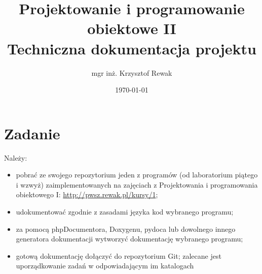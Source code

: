 \documentclass{article}
\title{
	Projektowanie i programowanie obiektowe II\\
	\Huge{Techniczna dokumentacja projektu}
}
\author{mgr inż. Krzysztof Rewak}
\date{\today}
\begin{document}
	\maketitle
	
	\section{Zadanie}
	Należy:
	\begin{itemize}
		\item pobrać ze swojego repozytorium jeden z programów (od laboratorium piątego i wzwyż) zaimplementowanych na zajęciach z Projektowania i programowania obiektowego I: \url{http://pwsz.rewak.pl/kursy/1};
		\item udokumentować zgodnie z zasadami języka kod wybranego programu; 
		\item za pomocą phpDocumentora, Doxygenu, pydoca lub dowolnego innego generatora dokumentacji wytworzyć dokumentację wybranego programu;
		\item gotową dokumentację dołączyć do repozytorium Git; zalecane jest uporządkowanie zadań w odpowiadającym im katalogach
	\end{itemize}
\end{document}
